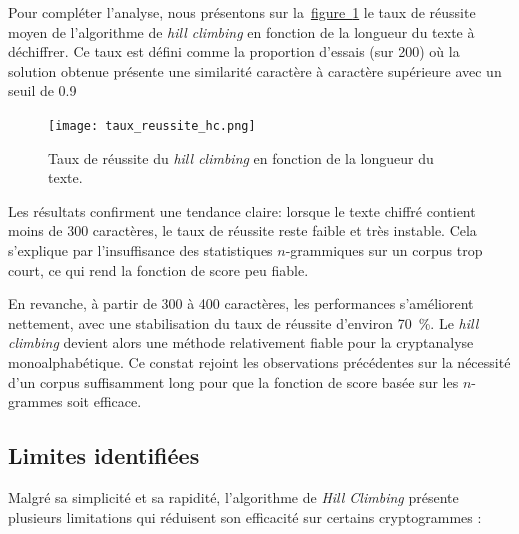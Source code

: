 \documentclass[a4paper]{article}
\newcommand{\figref}[1]{\hyperref[#1]{figure~\ref*{#1}}}
\begin{document}
Pour compléter l’analyse, nous présentons sur la~\figref{fig:taux_reussite} le taux de réussite moyen de l’algorithme de \textit{hill climbing} en fonction de la longueur du texte à déchiffrer. Ce taux est défini comme la proportion d’essais (sur 200) où la solution obtenue présente une similarité caractère à caractère supérieure avec un seuil de 0.9

\begin{figure}[H]
\centering
\texttt{[image: taux\_reussite\_hc.png]}
\caption{Taux de réussite du \textit{hill climbing} en fonction de la longueur du texte.}
\label{fig:taux_reussite}
\end{figure}


Les résultats confirment une tendance claire: lorsque le texte chiffré contient moins de 300 caractères, le taux de réussite reste faible et très instable. Cela s'explique par l’insuffisance des statistiques $n$-grammiques sur un corpus trop court, ce qui rend la fonction de score peu fiable.

En revanche, à partir de 300 à 400 caractères, les performances s'améliorent nettement, avec une stabilisation du taux de réussite d'environ 70~\%. Le \textit{hill climbing} devient alors une méthode relativement fiable pour la cryptanalyse monoalphabétique. Ce constat rejoint les observations précédentes sur la nécessité d’un corpus suffisamment long pour que la fonction de score basée sur les $n$-grammes soit efficace.



\subsection{Limites identifiées}

Malgré sa simplicité et sa rapidité, l’algorithme de \textit{Hill Climbing} présente plusieurs limitations qui réduisent son efficacité sur certains cryptogrammes :
\end{document}
